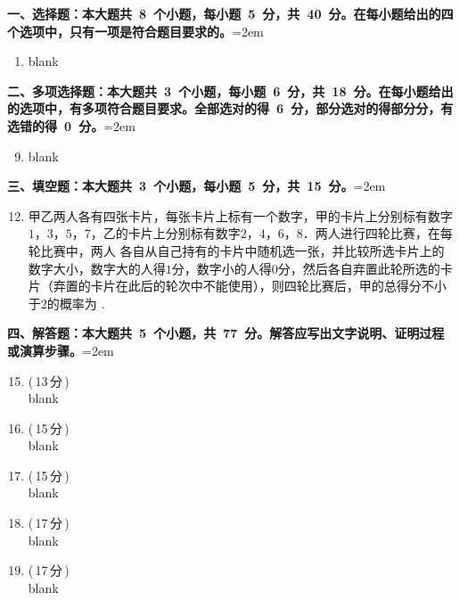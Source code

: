 \documentclass[twocolumn,landscape,UTF8]{ctexart}
\makeatletter
\newcommand{\fourch}[4]{\\\begin{tabular}{*{4}{@{}p{3.5cm}}}A.~#1 & B.~#2 & C.~#3 & D.~#4\end{tabular}} %
\newcommand{\twoch}[4]{\\\begin{tabular}{*{2}{@{}p{7cm}}}A.~#1 & B.~#2\end{tabular}\\\begin{tabular}{*{2}{@{}p{7cm}}}C.~#3 &
		D.~#4\end{tabular}}  %
\newcommand{\onech}[4]{\\A.~#1 \\ B.~#2 \\ C.~#3 \\ D.~#4}  %
\makeatother
\begin{document}
\vspace{6pt}
\begin{spacing}{1.25}

\noindent\textbf{一、选择题：本大题共~8~个小题，每小题~5~分，共~40~分。在每小题给出的四个选项中，只有一项是符合题目要求的。}\hangindent=2em
	\begin{enumerate}
	\setcounter{enumi}{0}

		\item blank %
	
\end{enumerate}

\noindent\textbf{二、多项选择题：本大题共~3~个小题，每小题~6~分，共~18~分。在每小题给出的选项中，有多项符合题目要求。全部选对的得~6~分，部分选对的得部分分，有选错的得~0~分。}\hangindent=2em
	\begin{enumerate}
	\setcounter{enumi}{8}

		\item blank
\end{enumerate}

\noindent\textbf{三、填空题：本大题共~3~个小题，每小题~5~分，共~15~分。}\hangindent=2em
	\begin{enumerate}
	\setcounter{enumi}{11}
			
		\item 甲乙两人各有四张卡片，每张卡片上标有一个数字，甲的卡片上分别标有数字$1$，$3$，$5$，$7$，乙的卡片上分别标有数字$2$，$4$，$6$，$8$．两人进行四轮比赛，在每轮比赛中，两人
		各自从自己持有的卡片中随机选一张，并比较所选卡片上的数字大小，数字大的人得$1$分，数字小的人得$0$分，然后各自弃置此轮所选的卡片（弃置的卡片在此后的轮次中不能使用），则四轮比赛后，甲的总得分不小于$2$的概率为
		\underline{\qquad \qquad}. 	

\end{enumerate}

\noindent\textbf{四、解答题：本大题共~5~个小题，共~77~分。解答应写出文字说明、证明过程或演算步骤。}\hangindent=2em
	\begin{enumerate}
	\setcounter{enumi}{14}
	
	\item (\,13\,分\,) \\
	blank

	\item (\,15\,分\,) \\
	blank

	\item (\,15\,分\,) \\
	blank

	\item (\,17\,分\,) \\
	blank

	\item (\,17\,分\,) \\
	blank

\end{enumerate}
\end{spacing}
\end{document}
